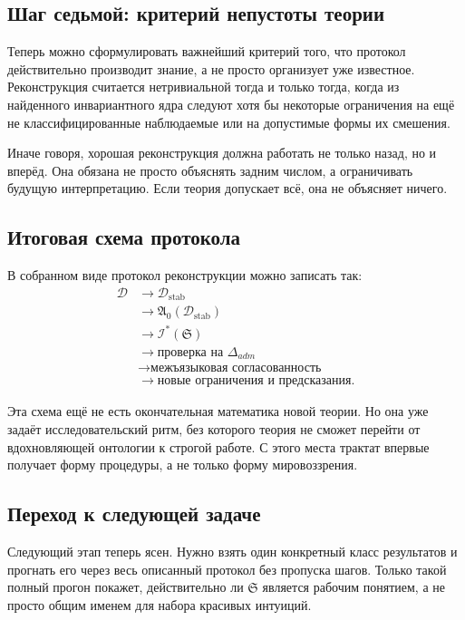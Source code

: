 \documentclass[12pt,a4paper]{article}
\begin{document}
\subsection{Шаг седьмой: критерий непустоты теории}

Теперь можно сформулировать важнейший критерий того, что протокол действительно производит знание, а не просто организует уже известное. Реконструкция считается нетривиальной тогда и только тогда, когда из найденного инвариантного ядра следуют хотя бы некоторые ограничения на ещё не классифицированные наблюдаемые или на допустимые формы их смешения.

Иначе говоря, хорошая реконструкция должна работать не только назад, но и вперёд. Она обязана не просто объяснять задним числом, а ограничивать будущую интерпретацию. Если теория допускает всё, она не объясняет ничего.

\subsection{Итоговая схема протокола}

В собранном виде протокол реконструкции можно записать так:
\begin{align}
\mathcal{D}
    &\longrightarrow \mathcal{D}_{\mathrm{stab}} \\
    &\longrightarrow \mathfrak{A}_0(\mathcal{D}_{\mathrm{stab}}) \\
    &\longrightarrow \mathcal{I}^*(\mathfrak{S}) \\
    &\longrightarrow \text{проверка на } \Delta_{adm} \\
    &\longrightarrow \text{межъязыковая согласованность} \\
    &\longrightarrow \text{новые ограничения и предсказания}.
\end{align}

Эта схема ещё не есть окончательная математика новой теории. Но она уже задаёт исследовательский ритм, без которого теория не сможет перейти от вдохновляющей онтологии к строгой работе. С этого места трактат впервые получает форму процедуры, а не только форму мировоззрения.

\subsection{Переход к следующей задаче}

Следующий этап теперь ясен. Нужно взять один конкретный класс результатов и прогнать его через весь описанный протокол без пропуска шагов. Только такой полный прогон покажет, действительно ли \(\mathfrak{S}\) является рабочим понятием, а не просто общим именем для набора красивых интуиций.
\end{document}
